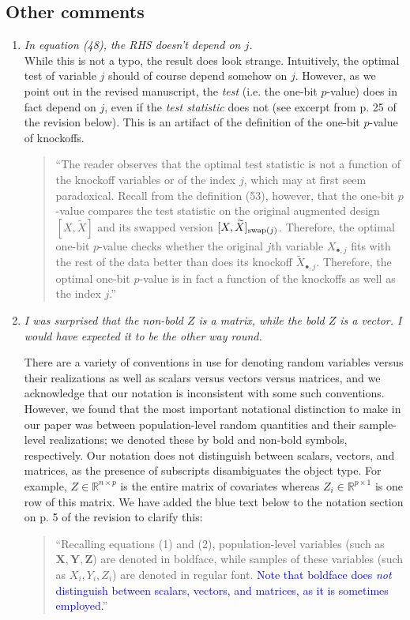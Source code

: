 \documentclass[12pt]{article}
\begin{document}
\subsection{Other comments}

\begin{enumerate}
	\item \textsl{In equation (48), the RHS doesn’t depend on $j$.} \\
	
	While this is not a typo, the result does look strange. Intuitively, the optimal test of variable $j$ should of course depend somehow on $j$. However, as we point out in the revised manuscript, the \textit{test} (i.e. the one-bit $p$-value) does in fact depend on $j$, even if the \textit{test statistic} does not (see excerpt from p. 25 of the revision below). This is an artifact of the definition of the one-bit $p$-value of knockoffs.
	\begin{quote}
		``The reader observes that the optimal test statistic is not a function of the knockoff variables or of the index $j$, which may at first seem paradoxical. Recall from the definition (53), however, that the one-bit $p$-value compares the test statistic on the original augmented design $[X, \widetilde X]$ and its swapped version $[X, \widetilde X]_{\textnormal{swap}(j)}$. Therefore, the optimal one-bit $p$-value checks whether the original $j$th variable $X_{\bullet, j}$ fits with the rest of the data better than does its knockoff $\widetilde X_{\bullet, j}$. Therefore, the optimal one-bit $p$-value is in fact a function of the knockoffs as well as the index $j$.''
	\end{quote}

	\item \textsl{I was surprised that the non-bold $Z$ is a matrix, while the bold $Z$ is a
		vector. I would have expected it to be the other way round.}
	
	There are a variety of conventions in use for denoting random variables versus their realizations as well as scalars versus vectors versus matrices, and we acknowledge that our notation is inconsistent with some such conventions. However, we found that the most important notational distinction to make in our paper was between population-level random quantities and their sample-level realizations; we denoted these by bold and non-bold symbols, respectively. Our notation does not distinguish between scalars, vectors, and matrices, as the presence of subscripts disambiguates the object type. For example, $Z \in \mathbb R^{n \times p}$ is the entire matrix of covariates whereas $Z_i \in \mathbb R^{p \times 1}$ is one row of this matrix. We have added the blue text below to the notation section on p. 5 of the revision to clarify this:
	\begin{quote}
	``Recalling equations (1) and (2), population-level variables (such as $\bm X, \bm Y, \bm Z$) are denoted in boldface, while samples of these variables (such as $X_i,Y_i,Z_i$) are denoted in regular font. \textcolor{blue}{Note that boldface does \textit{not} distinguish between scalars, vectors, and matrices, as it is sometimes employed.}'' 
	\end{quote}


\end{enumerate}
\end{document}
